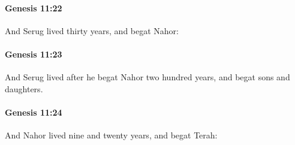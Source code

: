 		\paragraph{Genesis 11:22} %
			\label{GENESIS-11-22}

			And Serug lived thirty years, and begat Nahor:


		\paragraph{Genesis 11:23} %
			\label{GENESIS-11-23}

			And Serug lived after he begat Nahor two hundred years, and begat sons and daughters.


		\paragraph{Genesis 11:24} %
			\label{GENESIS-11-24}

			And Nahor lived nine and twenty years, and begat Terah:


